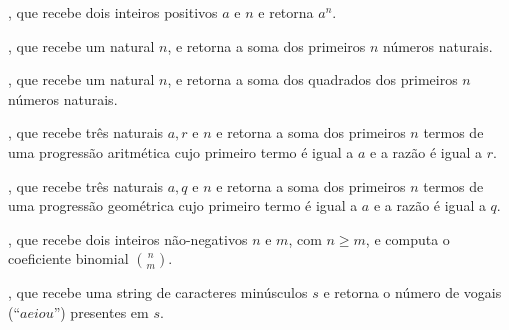 {{\begin{Qlist}
        \item[(f)] , que recebe dois inteiros positivos
            $a$ e $n$ e retorna $a^n$.
        \item[(g)] , que recebe um natural $n$, e retorna 
            a soma dos primeiros $n$ números naturais.
        \item[(h)] , que recebe um natural $n$, e 
            retorna a soma dos quadrados dos primeiros $n$ números naturais.
        \item[(i)] , que recebe 
            três naturais $a, r$ e $n$ e retorna a soma dos primeiros $n$ termos
            de uma progressão aritmética cujo primeiro termo é igual a $a$ e a razão é igual a $r$.
        \item[(j)] , que recebe
            três naturais $a, q$ e $n$ e retorna a soma dos primeiros $n$ termos
            de uma progressão geométrica cujo primeiro termo é igual a $a$ e a razão é igual a $q$.
        \item[(k)] , que recebe dois inteiros não-negativos
            $n$ e $m$, com $n \geq m$, e computa o coeficiente binomial $\binom{n}{m}$.
        \item[(l)] , que recebe uma string de caracteres
            minúsculos $s$ e retorna o número de vogais (``$aeiou$'') presentes em $s$.
    \end{Qlist}
} }




